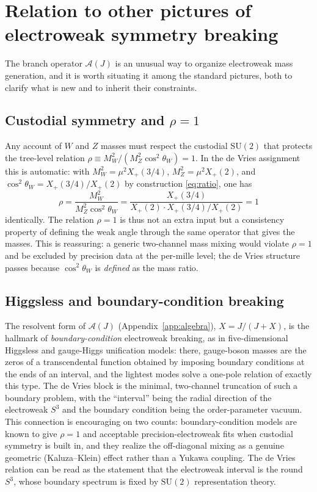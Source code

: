\documentclass[11pt]{article}
\theoremstyle{plain}
\theoremstyle{definition}
\newcommand{\cA}{\mathcal{A}}
\newcommand{\Xp}{X_{+}}
\newcommand{\SU}{\mathrm{SU}}
\begin{document}
\section{Relation to other pictures of electroweak symmetry breaking}
\label{sec:other}

The branch operator $\cA(J)$ is an unusual way to organize electroweak mass
generation, and it is worth situating it among the standard pictures, both
to clarify what is new and to inherit their constraints.

\subsection{Custodial symmetry and $\rho=1$}

Any account of $W$ and $Z$ masses must respect the custodial
$\SU(2)$ that protects the tree-level relation
$\rho\equiv M_W^2/(M_Z^2\cos^2\theta_W)=1$. In the de Vries assignment this
is automatic: with $M_W^2=\mu^2\Xp(3/4)$, $M_Z^2=\mu^2\Xp(2)$, and
$\cos^2\theta_W=\Xp(3/4)/\Xp(2)$ by construction \eqref{eq:ratio}, one has
\begin{equation}
\rho=\frac{M_W^2}{M_Z^2\cos^2\theta_W}
=\frac{\Xp(3/4)}{\Xp(2)\cdot\Xp(3/4)/\Xp(2)}=1
\end{equation}
identically. The relation $\rho=1$ is thus not an extra input but a
consistency property of defining the weak angle through the same operator
that gives the masses. This is reassuring: a generic two-channel mass mixing
would violate $\rho=1$ and be excluded by precision data at the per-mille
level; the de Vries structure passes because $\cos^2\theta_W$ is
\emph{defined} as the mass ratio.

\subsection{Higgsless and boundary-condition breaking}

The resolvent form of $\cA(J)$ (Appendix~\ref{app:algebra}),
$X=J/(J+X)$, is the hallmark of \emph{boundary-condition} electroweak
breaking, as in five-dimensional Higgsless and gauge-Higgs unification
models: there, gauge-boson masses are the zeros of a transcendental
function obtained by imposing boundary conditions at the ends of an
interval, and the lightest modes solve a one-pole relation of exactly this
type. The de Vries block is the minimal, two-channel truncation of such a
boundary problem, with the ``interval'' being the radial direction of the
electroweak $S^3$ and the boundary condition being the order-parameter
vacuum. This connection is encouraging on two counts: boundary-condition
models are known to give $\rho=1$ and acceptable precision-electroweak fits
when custodial symmetry is built in, and they realize the off-diagonal
mixing as a genuine geometric (Kaluza--Klein) effect rather than a Yukawa
coupling. The de Vries relation can be read as the statement that the
electroweak interval is the round $S^3$, whose boundary spectrum is fixed by
$\SU(2)$ representation theory.
\end{document}
